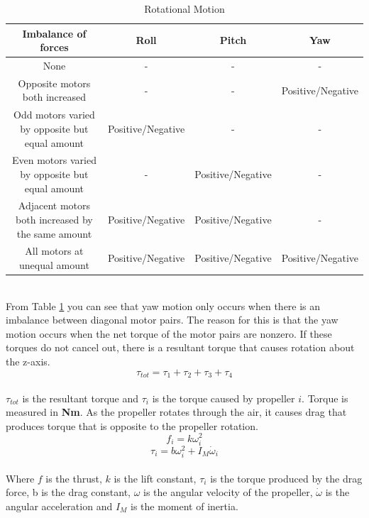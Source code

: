 \begin{table}[h]
\centering
\caption{Rotational Motion}

\begin{tabular}{ |c|c|c|c| } 
 \hline \rowcolor{white}
 \textbf{Imbalance of forces} & \textbf{Roll} & \textbf{Pitch} & \textbf{Yaw} \\
 \hline
 None & - & - & - \\ 
 Opposite motors both increased & - & - & Positive/Negative \\ 
 Odd motors varied by opposite but equal amount & Positive/Negative & - & - \\ 
 Even motors varied by opposite but equal amount & - & Positive/Negative & - \\ 
 Adjacent motors both increased by the same amount & Positive/Negative & Positive/Negative & - \\ 
 All motors at unequal amount & Positive/Negative & Positive/Negative & Positive/Negative \\ 
 \hline
\end{tabular}
\label{tabular:rotmot}
\end{table} \\
\noindent
From Table \ref{tabular:rotmot} you can see that yaw motion only occurs when there is an imbalance between diagonal motor pairs. The reason for this is that the yaw motion occurs when the net torque of the motor pairs are nonzero. If these torques do not cancel out, there is a resultant torque that causes rotation about the z-axis. 
\begin{equation}
\tau_{tot} = \tau_1 + \tau_2 + \tau_3 + \tau_4
\end{equation}
\\
$\tau_{tot}$ is the resultant torque and $\tau_i$ is the torque caused by propeller $i$. Torque is measured in \textbf{Nm}. As the propeller rotates through the air, it causes drag that produces torque that is opposite to the propeller rotation. 
\begin{equation}
f_i = k\omega_i^2
\end{equation}
\begin{equation}
\tau_i = b\omega_i^2 + I_M\dot{\omega}_i
\end{equation}
\\
Where $f$ is the thrust, $k$ is the lift constant, $\tau_i$ is the torque produced by the drag force, b is the drag constant, $\omega$ is the angular velocity of the propeller, $\dot{\omega}$ is the angular acceleration and $I_M$ is the moment of inertia. 
\\\\
